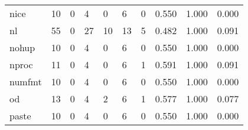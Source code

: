 \begin{longtable}{lp{2.0cm}p{2.0cm}p{2.0cm}p{2.0cm}p{2.0cm}p{2.0cm}p{2.0cm}p{2.0cm}p{2.0cm}}
nice      &                     10 &                                             0 &                                            4 &                                           0 &                                            6 &                                          0 &                                0.550 &                                  1.000 &                                0.000 \\
nl        &                     55 &                                             0 &                                           27 &                                          10 &                                           13 &                                          5 &                                0.482 &                                  1.000 &                                0.091 \\
nohup     &                     10 &                                             0 &                                            4 &                                           0 &                                            6 &                                          0 &                                0.550 &                                  1.000 &                                0.000 \\
nproc     &                     11 &                                             0 &                                            4 &                                           0 &                                            6 &                                          1 &                                0.591 &                                  1.000 &                                0.091 \\
numfmt    &                     10 &                                             0 &                                            4 &                                           0 &                                            6 &                                          0 &                                0.550 &                                  1.000 &                                0.000 \\
od        &                     13 &                                             0 &                                            4 &                                           2 &                                            6 &                                          1 &                                0.577 &                                  1.000 &                                0.077 \\
paste     &                     10 &                                             0 &                                            4 &                                           0 &                                            6 &                                          0 &                                0.550 &                                  1.000 &                                0.000 \\

\end{longtable}
